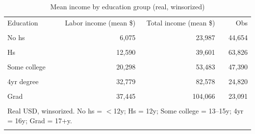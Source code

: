\begin{table}[htbp]\centering
\caption{Mean income by education group (real, winsorized)}
\label{tab:income_mean_by_educgroup_real_win}
\begin{tabular}{lrrr}\toprule
Education & Labor income (mean \$) & Total income (mean \$) & Obs \\\\ \midrule
No hs & 6,075 & 23,987 & 44,654 \\\\
Hs & 12,590 & 39,601 & 63,826 \\\\
Some college & 20,298 & 53,483 & 47,390 \\\\
4yr degree & 32,779 & 82,578 & 24,820 \\\\
Grad & 37,445 & 104,066 & 23,091 \\\\
\bottomrule
\multicolumn{4}{l}{\footnotesize Real USD, winsorized. No hs = $<$12y; Hs = 12y; Some college = 13--15y; 4yr = 16y; Grad = 17+y.} \\\\
\end{tabular}
\end{table}
